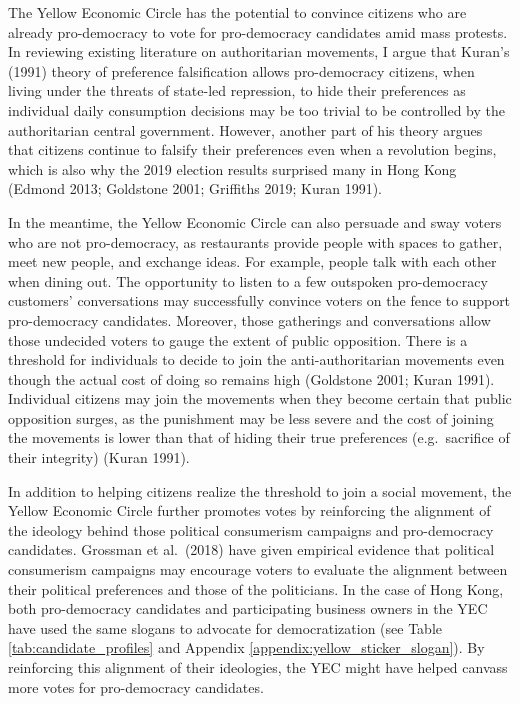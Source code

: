 \documentclass[letterpaper, 12pt]{article}
\begin{document}
The Yellow Economic Circle has the potential to convince citizens who are already pro-democracy to vote for pro-democracy candidates amid mass protests. In reviewing existing literature on authoritarian movements, I argue that Kuran's (1991) theory of preference falsification allows pro-democracy citizens, when living under the threats of state-led repression, to hide their preferences as individual daily consumption decisions may be too trivial to be controlled by the authoritarian central government. However, another part of his theory argues that citizens continue to falsify their preferences even when a revolution begins, which is also why the 2019 election results surprised many in Hong Kong (Edmond 2013; Goldstone 2001; Griffiths 2019; Kuran 1991). 

In the meantime, the Yellow Economic Circle can also persuade and sway voters who are not pro-democracy, as restaurants provide people with spaces to gather, meet new people, and exchange ideas. For example, people talk with each other when dining out. The opportunity to listen to a few outspoken pro-democracy customers' conversations may successfully convince voters on the fence to support pro-democracy candidates. Moreover, those gatherings and conversations allow those undecided voters to gauge the extent of public opposition. There is a threshold for individuals to decide to join the anti-authoritarian movements even though the actual cost of doing so remains high (Goldstone 2001; Kuran 1991). Individual citizens may join the movements when they become certain that public opposition surges, as the punishment may be less severe and the cost of joining the movements is lower than that of hiding their true preferences (e.g.\ sacrifice of their integrity) (Kuran 1991). 

In addition to helping citizens realize the threshold to join a social movement, the Yellow Economic Circle further promotes votes by reinforcing the alignment of the ideology behind those political consumerism campaigns and pro-democracy candidates. Grossman et al.\ (2018) have given empirical evidence that political consumerism campaigns may encourage voters to evaluate the alignment between their political preferences and those of the politicians. In the case of Hong Kong, both pro-democracy candidates and participating business owners in the YEC have used the same slogans to advocate for democratization (see Table \ref{tab:candidate_profiles} and Appendix \ref{appendix:yellow_sticker_slogan}). By reinforcing this alignment of their ideologies, the YEC might have helped canvass more votes for pro-democracy candidates. 
\end{document}
